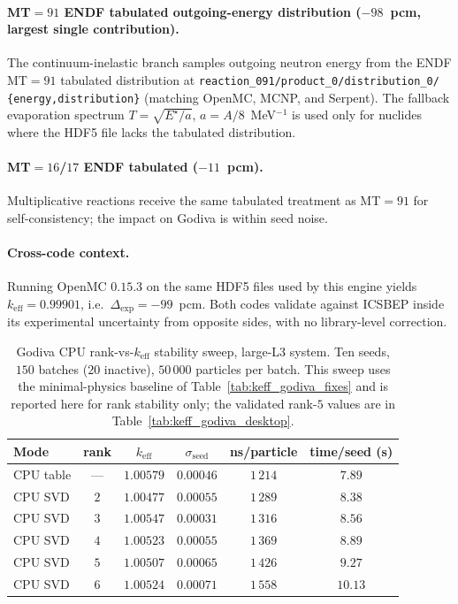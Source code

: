 \paragraph{MT$=91$ ENDF tabulated outgoing-energy
distribution ($-98$~pcm, largest single contribution).}
The continuum-inelastic branch samples outgoing neutron
energy from the ENDF MT$=91$ tabulated distribution at
\texttt{reaction\_091/product\_0/distribution\_0/}
\texttt{\{energy,distribution\}} (matching OpenMC, MCNP,
and Serpent). The fallback evaporation spectrum
$T = \sqrt{E^\star/a}$, $a = A/8$~MeV$^{-1}$ is used only
for nuclides where the HDF5 file lacks the tabulated
distribution.

\paragraph{MT$=16$/$17$ ENDF tabulated ($-11$~pcm).}
Multiplicative reactions receive the same tabulated
treatment as MT$=91$ for self-consistency; the impact on
Godiva is within seed noise.

\paragraph{Cross-code context.}
Running OpenMC $0.15.3$ on the same HDF5 files used by
this engine yields $k_\text{eff} = 0.99901$, i.e.\
$\Delta_\text{exp} = -99$~pcm. Both codes validate
against ICSBEP inside its experimental uncertainty from
opposite sides, with no library-level correction.

\begin{table}[t]
\centering
\caption{Godiva CPU rank-vs-$k_\text{eff}$ stability sweep,
large-L3 system. Ten seeds, $150$ batches ($20$ inactive),
$50\,000$ particles per batch. This sweep uses the
minimal-physics baseline of
Table~\ref{tab:keff_godiva_fixes} and is reported here for
rank stability only; the validated rank-$5$ values are in
Table~\ref{tab:keff_godiva_desktop}.}
\label{tab:keff_godiva_ranksweep}
\begin{tabular}{@{}lccccc@{}}
\toprule
Mode & rank & $k_\text{eff}$ & $\sigma_\text{seed}$ & ns/particle & time/seed (s) \\
\midrule
CPU table       & ---  & $1.00579$ & $0.00046$ & $1\,214$ & $7.89$ \\
CPU SVD         & $2$  & $1.00477$ & $0.00055$ & $1\,289$ & $8.38$ \\
CPU SVD         & $3$  & $1.00547$ & $0.00031$ & $1\,316$ & $8.56$ \\
CPU SVD         & $4$  & $1.00523$ & $0.00055$ & $1\,369$ & $8.89$ \\
CPU SVD         & $5$  & $1.00507$ & $0.00065$ & $1\,426$ & $9.27$ \\
CPU SVD         & $6$  & $1.00524$ & $0.00071$ & $1\,558$ & $10.13$ \\
\bottomrule
\end{tabular}
\end{table}

